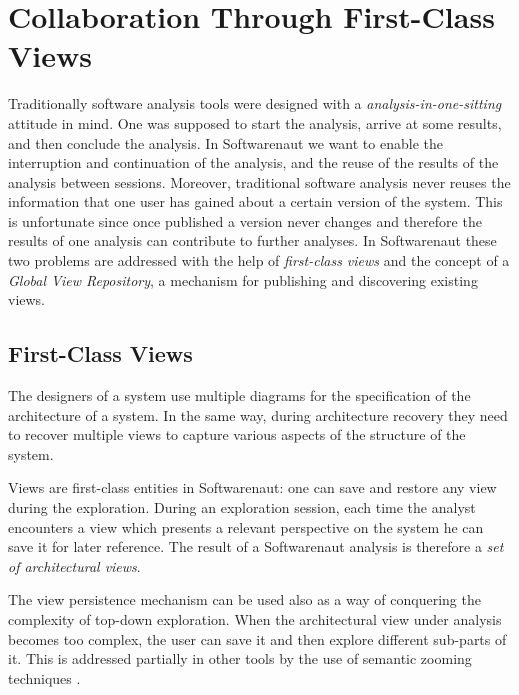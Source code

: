 \documentclass[preprint,12pt]{elsarticle}
\begin{document}
\section {Collaboration Through First-Class Views} 

Traditionally software analysis tools were designed with a {\em analysis-in-one-sitting} attitude  in mind. One was supposed to start the analysis, arrive at some results, and then conclude the analysis. In Softwarenaut we want to enable the interruption and continuation of the analysis, and the reuse of the results of the analysis between sessions. Moreover, traditional software analysis never reuses the information that one user has gained about a certain version of the system. This is {unfortunate} since once published a version never changes and therefore the results of one analysis can {contribute to} further analyses. In Softwarenaut these two problems are addressed with the help of {\em first-class views} and the concept of a {\em Global View Repository}, a mechanism for publishing and discovering existing views.

\subsection {First-Class Views}

The designers of a system use multiple diagrams for the specification of the architecture of a system. In the same way, during architecture recovery they need to recover multiple views to capture various aspects of the structure of the system. 

Views are first-class entities in Softwarenaut: one can save and restore any view during the exploration. During an exploration session, each time the analyst encounters a view which presents a relevant perspective on the system he can save it for later reference. The result of a Softwarenaut analysis is therefore a {\em set of architectural views}.

The view persistence mechanism can be used also as a way of conquering the complexity of top-down exploration. When the architectural view under analysis becomes too complex, the user can save it and then explore different sub-parts of it. This is addressed partially in other tools by the use of semantic zooming techniques \cite{storey-shrimp}. 
\end{document}

